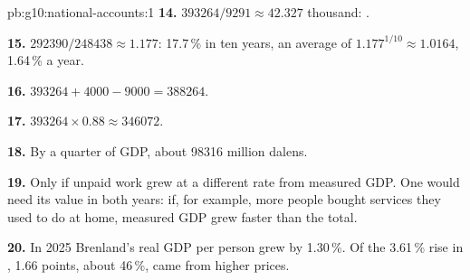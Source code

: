 \begin{solution}{pb:g10:national-accounts:1}
\textbf{14.} $393264/9291 \approx 42.327$ thousand: .

\textbf{15.} $292390/248438 \approx 1.177$: 17.7\,\% in ten years, an average of $1.177^{1/10} \approx 1.0164$, 1.64\,\% a year.

\textbf{16.} $393264 + 4000 - 9000 = 388264$.

\textbf{17.} $393264 \times 0.88 \approx 346072$.

\textbf{18.} By a quarter of GDP, about \num{98316} million dalens.

\textbf{19.} Only if unpaid work grew at a different rate from measured GDP. One would need its value in both years: if, for example, more people bought services they used to
do at home, measured GDP grew faster than the total.

\textbf{20.} In 2025 Brenland's real GDP per person grew by 1.30\,\%. Of the 3.61\,\% rise in , 1.66 points, about 46\,\%, came from higher prices.
\end{solution}
